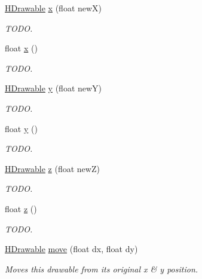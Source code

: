 \begin{DoxyCompactItemize}
\hyperlink{classhype_1_1drawable_1_1_h_drawable}{H\-Drawable} \hyperlink{classhype_1_1drawable_1_1_h_drawable_aae828fe1677025d019df207f62771def}{x} (float new\-X)
\begin{DoxyCompactList}\small\item\em T\-O\-D\-O. \end{DoxyCompactList}\item 
float \hyperlink{classhype_1_1drawable_1_1_h_drawable_a5d15bcfcf4b2f28f463340a891c03723}{x} ()
\begin{DoxyCompactList}\small\item\em T\-O\-D\-O. \end{DoxyCompactList}\item 
\hyperlink{classhype_1_1drawable_1_1_h_drawable}{H\-Drawable} \hyperlink{classhype_1_1drawable_1_1_h_drawable_a47920e2ad0509a57687a687044a2f2b6}{y} (float new\-Y)
\begin{DoxyCompactList}\small\item\em T\-O\-D\-O. \end{DoxyCompactList}\item 
float \hyperlink{classhype_1_1drawable_1_1_h_drawable_a30c54761208704a922b0acdfd40ca8d1}{y} ()
\begin{DoxyCompactList}\small\item\em T\-O\-D\-O. \end{DoxyCompactList}\item 
\hyperlink{classhype_1_1drawable_1_1_h_drawable}{H\-Drawable} \hyperlink{classhype_1_1drawable_1_1_h_drawable_a3208358a57a297c1671901555e51bd59}{z} (float new\-Z)
\begin{DoxyCompactList}\small\item\em T\-O\-D\-O. \end{DoxyCompactList}\item 
float \hyperlink{classhype_1_1drawable_1_1_h_drawable_ababc3566a7431aa4dfe0ce755894e502}{z} ()
\begin{DoxyCompactList}\small\item\em T\-O\-D\-O. \end{DoxyCompactList}\item 
\hyperlink{classhype_1_1drawable_1_1_h_drawable}{H\-Drawable} \hyperlink{classhype_1_1drawable_1_1_h_drawable_a0e5c5a9eb856155384d4b34a90cd38eb}{move} (float dx, float dy)
\begin{DoxyCompactList}\small\item\em Moves this drawable from its original x \& y position. \end{DoxyCompactList}\item 

\end{DoxyCompactItemize}
